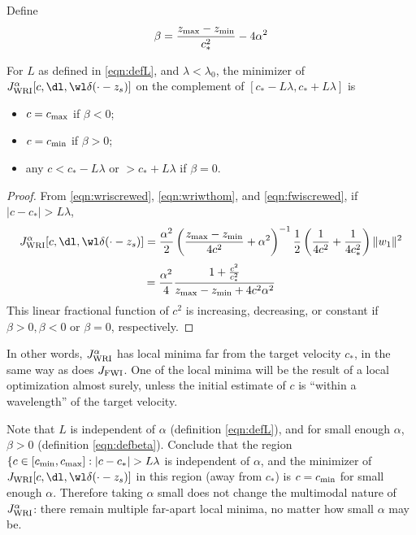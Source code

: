 Define
\begin{equation}
  \label{eqn:defbeta}
\beta = \frac{z_{\rm max}-z_{\rm min}}{c_*^2} - 4 \alpha^2
\end{equation}
\begin{theorem}
  \label{thm:thm2}
  For $L$ as defined in \ref{eqn:defL}, and $\lambda <
  \lambda_0$, the minimizer of $J_{\rm WRI}^{\alpha}[c,\dl,\wl \delta(\cdot-z_s)]$ on the
  complement of $[c_*-L\lambda, c_*+L\lambda]$ is
  \begin{itemize}
  \item $c=c_{\rm max}$ if $\beta<0$;
  \item $c=c_{\rm min}$ if $\beta>0$;
  \item any $c < c_*-L\lambda$ or $>c_*+L\lambda$ if $\beta=0$.
  \end{itemize}
\end{theorem}
\begin{proof}
  From \ref{eqn:wriscrewed}, \ref{eqn:wriwthom}, and
  \ref{eqn:fwiscrewed}, if $|c-c_*| > L\lambda$,
  \[
    J_{\rm WRI}^{\alpha}[c,\dl,\wl\delta(\cdot-z_s)] =
    \frac{\alpha^2}{2}\left(\frac{z_{\rm max}-z_{\rm
          min}}{4c^2}+\alpha^2\right)^{-1}\frac{1}{2}\left(\frac{1}{4c^2}+\frac{1}{4c_*^2}\right)\|w_1\|^2
  \]
  \[
    =
    \frac{\alpha^2}{4}\frac{1+\frac{c^2}{c_*^2}}{z_{\rm 
        max}-z_{\rm min}+4c^2\alpha^2}
  \]
  This linear fractional function of $c^2$ is increasing, decreasing,
  or constant if $\beta>0, \beta<0$ or $\beta=0$, respectively.
\end{proof}

In other words, $J_{\rm WRI}^{\alpha}$ has local minima far from the target
velocity $c_*$, in the same way as does $J_{\rm FWI}$. One of the
local minima will be the result of a local optimization almost surely,
unless the initial estimate of $c$ is ``within a wavelength'' of the
target velocity.

Note that $L$ is independent of $\alpha$ (definition \ref{eqn:defL}),
and for small enough $\alpha$, $\beta > 0$ (definition
\ref{eqn:defbeta}). Conclude that the region $\{c \in [c_{\rm min},
c_{\rm max}]: |c-c_*| > L\lambda$ is
independent of $\alpha$, and the minimizer of
$J_{\rm WRI}[c,\dl,\wl\delta(\cdot-z_s)]$ in this region (away from
$c_*$) is $c=c_{\rm min}$ for small enough $\alpha$. Therefore taking
$\alpha$ small does not change the multimodal nature of
$J_{\rm WRI}^{\alpha}$: there remain multiple far-apart local minima,
no matter how small $\alpha$ may be.


